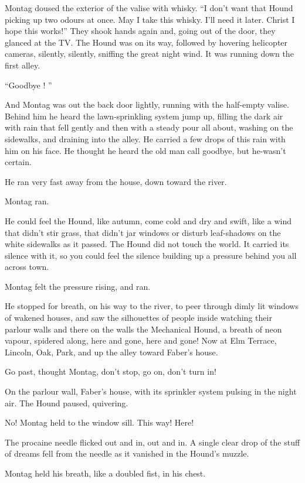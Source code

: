 \documentclass[11pt,openany]{book}
\begin{document}
Montag doused the exterior of the valise with whisky. ``I don't want that Hound picking up two odours at once. May I take this whisky. I'll need it later. Christ I hope this works!'' They shook hands again and, going out of the door, they glanced at the TV. The Hound was on its way, followed by hovering helicopter cameras, silently, silently, sniffing the great night wind. It was running down the first alley.

``Goodbye ! ''

And Montag was out the back door lightly, running with the half-empty valise. Behind him he heard the lawn-sprinkling system jump up, filling the dark air with rain that fell gently and then with a steady pour all about, washing on the sidewalks, and draining into the alley. He carried a few drops of this rain with him on his face. He thought he heard the old man call goodbye, but he-wasn't certain.

He ran very fast away from the house, down toward the river.

Montag ran.

He could feel the Hound, like autumn, come cold and dry and swift, like a wind that didn't stir grass, that didn't jar windows or disturb leaf-shadows on the white sidewalks as it passed. The Hound did not touch the world. It carried its silence with it, so you could feel the silence building up a pressure behind you all across town.

Montag felt the pressure rising, and ran.

He stopped for breath, on his way to the river, to peer through dimly lit windows of wakened houses, and saw the silhouettes of people inside watching their parlour walls and there on the walls the Mechanical Hound, a breath of neon vapour, spidered along, here and gone, here and gone! Now at Elm Terrace, Lincoln, Oak, Park, and up the alley toward Faber's house.

Go past, thought Montag, don't stop, go on, don't turn in!

On the parlour wall, Faber's house, with its sprinkler system pulsing in the night air. The Hound paused, quivering.

No! Montag held to the window sill. This way! Here!

The procaine needle flicked out and in, out and in. A single clear drop of the stuff of dreams fell from the needle as it vanished in the Hound's muzzle.

Montag held his breath, like a doubled fist, in his chest.
\end{document}
